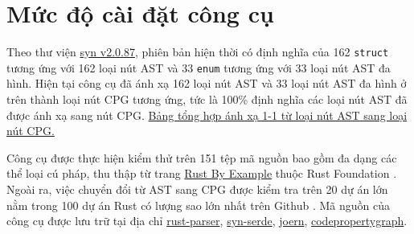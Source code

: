 \section{Mức độ cài đặt công cụ}

Theo thư viện \href{https://docs.rs/syn/2.0.87/syn/}{syn v2.0.87}, phiên bản hiện thời có định nghĩa của 162 \texttt{struct} tương ứng với 162 loại nút AST và 33 \texttt{enum} tương ứng với 33 loại nút AST đa hình.
Hiện tại công cụ đã ánh xạ 162 loại nút AST và 33 loại nút AST đa hình ở trên thành loại nút CPG tương ứng, tức là 100\% định nghĩa các loại nút AST đã được ánh xạ sang nút CPG.
\href{https://github.com/congnghiahieu/rust-parser/blob/master/docs/MAPPING.md}{Bảng tổng hợp ánh xạ 1-1 từ loại nút AST sang loại nút CPG.}

Công cụ được thực hiện kiểm thử trên 151 tệp mã nguồn bao gồm đa dạng các thể loại cú pháp, thu thập từ trang \href{https://doc.rust-lang.org/stable/rust-by-example/index.html}{Rust By Example} thuộc Rust Foundation \cite{rustlangRustFoundation}.
Ngoài ra, việc chuyển đổi từ AST sang CPG được kiểm tra trên 20 dự án lớn nằm trong 100 dự án Rust có lượng sao lớn nhất trên Github \cite {githubGithubRankingTop100RustmdMaster}.
Mã nguồn của công cụ được lưu trữ tại địa chỉ \href{https://github.com/congnghiahieu/rust-parser}{rust-parser}, \href{https://github.com/congnghiahieu/syn-serde}{syn-serde}, \href{https://github.com/congnghiahieu/joern}{joern}, \href{https://github.com/congnghiahieu/codepropertygraph}{codepropertygraph}.
